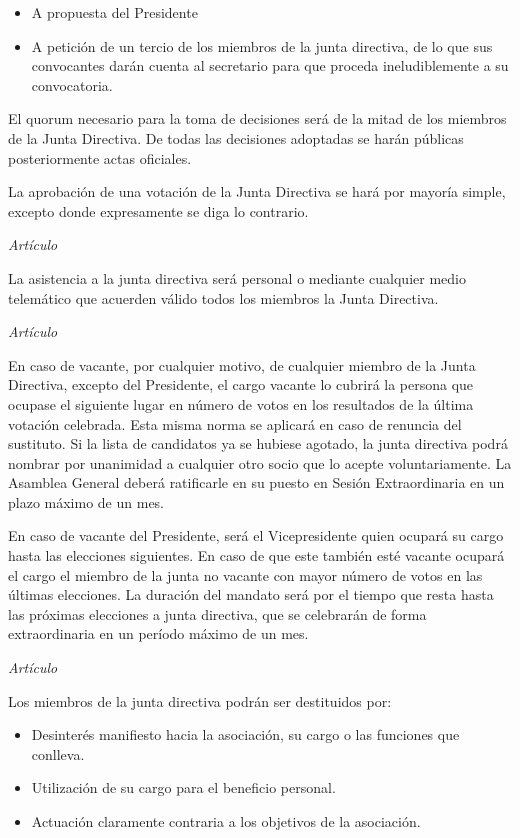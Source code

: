 \documentclass[11pt,oneside,onecolumn,a4paper]{article} \usepackage[utf8]{inputenc} \usepackage[spanish]{babel} \usepackage{enumerate} \pagestyle{plain}
\newcounter{articulos} \setcounter{articulos}{1} \newcounter{capitulos} \setcounter{capitulos}{1} \newcounter{titulos} \setcounter{titulos}{1}
\newcommand{\articulo}{\medskip \noindent \emph{Artículo \arabic{articulos} } \smallskip \addtocounter{articulos}{1}} \newcommand{\titulo}[1]{\medskip \noindent \emph{Título \roman{titulos}:} #1 \addcontentsline{toc}{section}{Título \roman{titulos}: #1} \smallskip \addtocounter{titulos}{1}} \newcommand{\capitulo}[1]{\medskip \noindent \emph{Capítulo \roman{capitulos}:} #1 \addcontentsline{toc}{subsection}{Capítulo \roman{capitulos}: #1} \smallskip \addtocounter{capitulos}{1}}
\begin{document}
	  \begin{itemize}

	    \item A propuesta del Presidente \item A petición de un tercio de los miembros de la junta directiva, de lo que sus convocantes darán cuenta al secretario para que proceda ineludiblemente a su convocatoria.

	    \end{itemize}

	    El quorum necesario para la toma de decisiones será de la mitad de los miembros de la Junta Directiva. De todas las decisiones adoptadas se harán públicas posteriormente actas oficiales.

	    La aprobación de una votación de la Junta Directiva se hará por mayoría simple, excepto donde expresamente se diga lo contrario.

	    \articulo

	    La asistencia a la junta directiva será personal o mediante cualquier medio telemático que acuerden válido todos los miembros la Junta Directiva.

	    \articulo

	    En caso de vacante, por cualquier motivo, de cualquier miembro de la Junta Directiva, excepto del Presidente, el cargo vacante lo cubrirá la persona que ocupase el siguiente lugar en número de votos en los resultados de la última votación celebrada. Esta misma norma se aplicará en caso de renuncia del sustituto.  Si la lista de candidatos ya se hubiese agotado, la junta directiva podrá nombrar por unanimidad a cualquier otro socio que lo acepte voluntariamente. La Asamblea General deberá ratificarle en su puesto en Sesión Extraordinaria en un plazo máximo de un mes.

	    En caso de vacante del Presidente, será el Vicepresidente quien ocupará su cargo hasta las elecciones siguientes. En caso de que este también esté vacante ocupará el cargo el miembro de la junta no vacante con mayor número de votos en las últimas elecciones. La duración del mandato será por el tiempo que resta hasta las próximas elecciones a junta directiva, que se celebrarán de forma extraordinaria en un período máximo de un mes.

	    \articulo

	    Los miembros de la junta directiva podrán ser destituidos por:

	    \begin{itemize}

	      \item Desinterés manifiesto hacia la asociación, su cargo o las funciones que conlleva. \item Utilización de su cargo para el beneficio personal. \item Actuación claramente contraria a los objetivos de la asociación.

	      \end{itemize}
\end{document}
